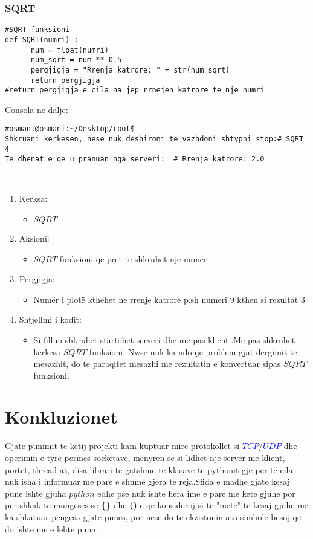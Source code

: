 \documentclass[]{article}
\begin{document}
\subsubsection{SQRT}
\begin{lstlisting}
#SQRT funksioni
def SQRT(numri) :
      num = float(numri)
      num_sqrt = num ** 0.5
      pergjigja = "Rrenja katrore: " + str(num_sqrt) 
      return pergjigja
#return pergjigja e cila na jep rrnejen katrore te nje numri
\end{lstlisting}
\vspace{1cm}
\noindent Consola ne dalje:
\begin{lstlisting}
#osmani@osmani:~/Desktop/root$
Shkruani kerkesen, nese nuk deshironi te vazhdoni shtypni stop:# SQRT 4
Te dhenat e qe u pranuan nga serveri:  # Rrenja katrore: 2.0



\end{lstlisting}

\begin{enumerate}
\item Kerksa:

\begin{itemize}
\item $SQRT$
\end{itemize}
\item Aksioni:
\begin{itemize}
\item $SQRT$ funksioni qe pret te shkruhet nje numer
\end{itemize}
\item Pergjigja:
\begin{itemize}
\item Numër i plotë kthehet ne rrenje katrore p.sh numeri 9 kthen si
rezultat 3
\end{itemize}
\item Shtjellmi i kodit:
\begin{itemize}
\item Si fillim shkruhet startohet serveri dhe me pas klienti.Me pas
shkruhet kerkesa $SQRT$ funksioni. Nwse nuk ka ndonje
problem gjat dergimit te mesazhit,  do te paraqitet
mesazhi me rezultatin e konvertuar sipas $SQRT$ funksioni.
\end{itemize}
\end{enumerate}
\newpage
\section{Konkluzionet}
Gjate punimit te  ketij projekti kam kuptuar mire protokollet si \textcolor{blue}{$TCP$}/\textcolor{blue}{$UDP$} dhe operimin e tyre permes socketave, menyren se si lidhet nje server me klient, portet, thread-at, disa librari te gatshme te klasave te pythonit gje per te cilat nuk isha i informuar me pare e shume gjera te reja.Sfida e madhe gjate kesaj pune ishte gjuha $python$ edhe pse nuk ishte hera ime e pare me kete gjuhe por per shkak te mungeses se \textbf{\{\}} dhe \textbf{()} e qe konsideroj si te "mete"  te kesaj gjuhe  me ka shkatuar pengesa gjate punes, por nese do te ekzistonin ato simbole besoj qe do ishte me e lehte puna.
\vspace*{2cm}
\end{document}
